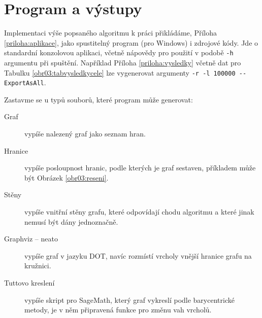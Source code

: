 \section{Program a výstupy} \label{prg&vystupy}

Implementaci výše popsaného algoritmu k práci přikládáme, Příloha \ref{priloha:aplikace}, jako spustitelný program (pro Windows) i zdrojové kódy. Jde o standardní konzolovou aplikaci, včetně nápovědy pro použití v podobě \texttt{-h} argumentu při spuštění. Například Příloha \ref{priloha:vysledky} včetně dat pro Tabulku \ref{obr03:tabvysledkycele} lze vygenerovat argumenty \texttt{-r -l 100000 -{}-ExportAsAll}.

Zastavme se u typů souborů, které program může generovat:
\begin{description}

\item[Graf] vypíše nalezený graf jako seznam hran.
\item[Hranice] vypíše posloupnost hranic, podle kterých je graf sestaven, příkladem může být Obrázek \ref{obr03:reseni}.
\item[Stěny] vypíše vnitřní stěny grafu, které odpovídají chodu algoritmu a které jinak nemusí být dány jednoznačně.
\item[Graphviz -- neato] vypíše graf v jazyku DOT, navíc rozmístí vrcholy vnější hranice grafu na kružnici.
\item[Tuttovo kreslení] vypíše skript pro SageMath, který graf vykreslí podle barycentrické metody, je v něm připravená funkce pro změnu vah vrcholů.

\end{description}


